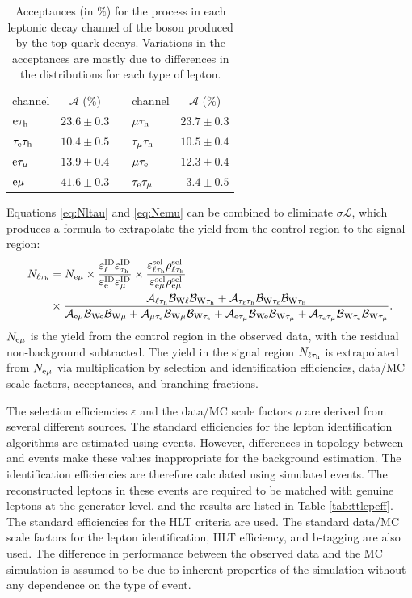 \begin{table}
  \begin{center}
    \begin{tabular}{|l|r|c|l|r|}
      \cline{1-2}\cline{4-5}
      channel & \multicolumn{1}{c|}{$\mathcal{A}$ (\%)} && channel & \multicolumn{1}{c|}{$\mathcal{A}$ (\%)} \\
      \cline{1-2}\cline{4-5}
      $\mathrm{e}\tau_{\text{h}}$ & $23.6\pm0.3$ && $\mu\tau_{\text{h}}$ & $23.7\pm0.3$ \\
      $\tau_{\mathrm{e}}\tau_{\text{h}}$ & $10.4\pm0.5$ && $\tau_{\mu}\tau_{\text{h}}$ & $10.5\pm0.4$ \\
      $\mathrm{e}\tau_{\mu}$ & $13.9\pm0.4$ && $\mu\tau_{\mathrm{e}}$ & $12.3\pm0.4$ \\
      $\mathrm{e}\mu$ & $41.6\pm0.3$ && $\tau_{\mathrm{e}}\tau_{\mu}$ & $3.4\pm0.5$ \\
      \cline{1-2}\cline{4-5}
    \end{tabular}
    \caption{Acceptances (in \%) for the \ttbar process in each leptonic decay channel of the \W boson produced by the top quark decays. Variations in the acceptances are mostly due to differences in the \pt distributions for each type of lepton.}
    \label{tab:TTAcc}
  \end{center}
\end{table}

Equations \eqref{eq:Nltau} and \eqref{eq:Nemu} can be combined to eliminate $\sigma\mathcal{L}$, which produces a formula to extrapolate the \ttbar yield from the \emu control region to the \ltau signal region:
\begin{align}
\label{eq:ttbartot}
N_{\ell\tau_{\text{h}}} &= N_{\mathrm{e}\mu} \times \frac{\varepsilon_{\ell}^{\text{ID}}\varepsilon_{\tau_{\text{h}}}^{\text{ID}}}{\varepsilon_{\mathrm{e}}^{\text{ID}}\varepsilon_{\mu}^{\text{ID}}} \times \frac{\varepsilon^{\text{sel}}_{\ell\tau_{\text{h}}}\rho^{\text{sel}}_{\ell\tau_{\text{h}}}}{\varepsilon^{\text{sel}}_{\mathrm{e}\mu}\rho^{\text{sel}}_{\mathrm{e}\mu}} \nonumber \\
&\times \frac{\mathcal{A}_{\ell\tau_{\text{h}}}\mathcal{B}_{\mathrm{W}\ell}\mathcal{B}_{\mathrm{W}\tau_{\text{h}}} + \mathcal{A}_{\tau_{\ell}\tau_{\text{h}}}\mathcal{B}_{\mathrm{W}\tau_{\ell}}\mathcal{B}_{\mathrm{W}\tau_{\text{h}}}}{\mathcal{A}_{\mathrm{e}\mu}\mathcal{B}_{\mathrm{W}\mathrm{e}}\mathcal{B}_{\mathrm{W}\mu} + \mathcal{A}_{\mu\tau_{\mathrm{e}}}\mathcal{B}_{\mathrm{W}\mu}\mathcal{B}_{\mathrm{W}\tau_{\mathrm{e}}} + \mathcal{A}_{\mathrm{e}\tau_{\mu}}\mathcal{B}_{\mathrm{W}\mathrm{e}}\mathcal{B}_{\mathrm{W}\tau_{\mu}} + \mathcal{A}_{\tau_{\mathrm{e}}\tau_{\mu}}\mathcal{B}_{\mathrm{W}\tau_{\mathrm{e}}}\mathcal{B}_{\mathrm{W}\tau_{\mu}}}.
\end{align}
$N_{\mathrm{e}\mu}$ is the yield from the \emu control region in the observed data, with the residual non-\ttbar background subtracted. The yield in the signal region $N_{\ell\tau_{\text{h}}}$ is extrapolated from $N_{\mathrm{e}\mu}$ via multiplication by selection and identification efficiencies, data/MC scale factors, acceptances, and branching fractions.

The selection efficiencies $\varepsilon$ and the data/MC scale factors $\rho$ are derived from several different sources. The standard efficiencies for the lepton identification algorithms are estimated using \Z events. However, differences in topology between \ttbar and \Z events make these values inappropriate for the \ttbar background estimation. The identification efficiencies are therefore calculated using simulated \ttbar events. The reconstructed leptons in these events are required to be matched with genuine leptons at the generator level, and the results are listed in Table \ref{tab:ttlepeff}. The standard efficiencies for the HLT criteria are used. The standard data/MC scale factors for the lepton identification, HLT efficiency, and b-tagging are also used. The difference in performance between the observed data and the MC simulation is assumed to be due to inherent properties of the simulation without any dependence on the type of event.


